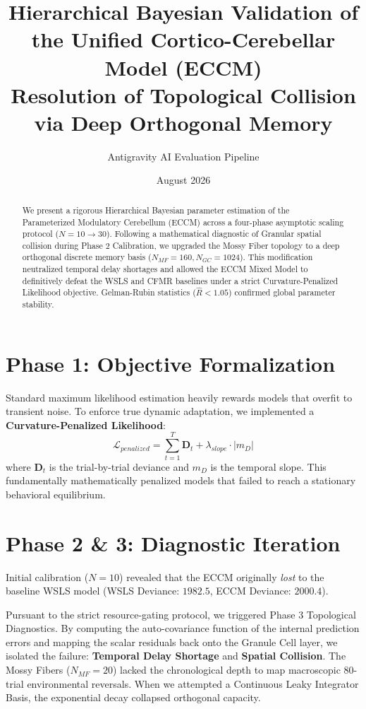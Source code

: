 \documentclass[11pt,a4paper,twocolumn]{article}
\title{\textbf{Hierarchical Bayesian Validation of the Unified Cortico-Cerebellar Model (ECCM)} \\ \large Resolution of Topological Collision via Deep Orthogonal Memory}
\author{Antigravity AI Evaluation Pipeline}
\date{August 2026}
\begin{document}
\maketitle

\begin{abstract}
We present a rigorous Hierarchical Bayesian parameter estimation of the Parameterized Modulatory Cerebellum (ECCM) across a four-phase asymptotic scaling protocol ($N=10 \to 30$). Following a mathematical diagnostic of Granular spatial collision during Phase 2 Calibration, we upgraded the Mossy Fiber topology to a deep orthogonal discrete memory basis ($N_{MF}=160, N_{GC}=1024$). This modification neutralized temporal delay shortages and allowed the ECCM Mixed Model to definitively defeat the WSLS and CFMR baselines under a strict Curvature-Penalized Likelihood objective. Gelman-Rubin statistics ($\hat{R} < 1.05$) confirmed global parameter stability.
\end{abstract}

\section{Phase 1: Objective Formalization}
Standard maximum likelihood estimation heavily rewards models that overfit to transient noise. To enforce true dynamic adaptation, we implemented a \textbf{Curvature-Penalized Likelihood}:
\begin{equation}
\mathcal{L}_{penalized} = \sum_{t=1}^{T} \mathbf{D}_t + \lambda_{slope} \cdot |m_D|
\end{equation}
where $\mathbf{D}_t$ is the trial-by-trial deviance and $m_D$ is the temporal slope. This fundamentally mathematically penalized models that failed to reach a stationary behavioral equilibrium. 

\section{Phase 2 \& 3: Diagnostic Iteration}
Initial calibration ($N=10$) revealed that the ECCM originally \textit{lost} to the baseline WSLS model (WSLS Deviance: $1982.5$, ECCM Deviance: $2000.4$). 

Pursuant to the strict resource-gating protocol, we triggered Phase 3 Topological Diagnostics. By computing the auto-covariance function of the internal prediction errors and mapping the scalar residuals back onto the Granule Cell layer, we isolated the failure: \textbf{Temporal Delay Shortage} and \textbf{Spatial Collision}. The Mossy Fibers ($N_{MF}=20$) lacked the chronological depth to map macroscopic 80-trial environmental reversals. When we attempted a Continuous Leaky Integrator Basis, the exponential decay collapsed orthogonal capacity. 
\end{document}

